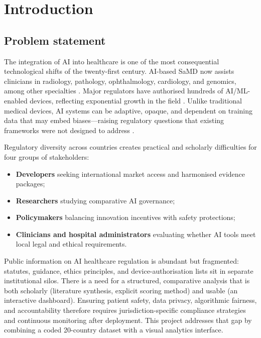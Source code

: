 \documentclass[12pt,a4paper]{report}
\begin{document}
\chapter{Introduction}
\label{ch:intro}

\section{Problem statement}

The integration of AI into healthcare is one of the most consequential technological shifts of the twenty-first century. AI-based SaMD now assists clinicians in radiology, pathology, ophthalmology, cardiology, and genomics, among other specialties \cite{topol2019,rajpurkar2022}. Major regulators have authorised hundreds of AI/ML-enabled devices, reflecting exponential growth in the field \cite{fda2021,wu2021}. Unlike traditional medical devices, AI systems can be adaptive, opaque, and dependent on training data that may embed biases---raising regulatory questions that existing frameworks were not designed to address \cite{gerke2020,char2018}.

Regulatory diversity across countries creates practical and scholarly difficulties for four groups of stakeholders:
\begin{itemize}
  \item \textbf{Developers} seeking international market access and harmonised evidence packages;
  \item \textbf{Researchers} studying comparative AI governance;
  \item \textbf{Policymakers} balancing innovation incentives with safety protections;
  \item \textbf{Clinicians and hospital administrators} evaluating whether AI tools meet local legal and ethical requirements.
\end{itemize}

Public information on AI healthcare regulation is abundant but fragmented: statutes, guidance, ethics principles, and device-authorisation lists sit in separate institutional silos. There is a need for a structured, comparative analysis that is both scholarly (literature synthesis, explicit scoring method) and usable (an interactive dashboard). Ensuring patient safety, data privacy, algorithmic fairness, and accountability therefore requires jurisdiction-specific compliance strategies and continuous monitoring after deployment. This project addresses that gap by combining a coded 20-country dataset with a visual analytics interface.
\end{document}
